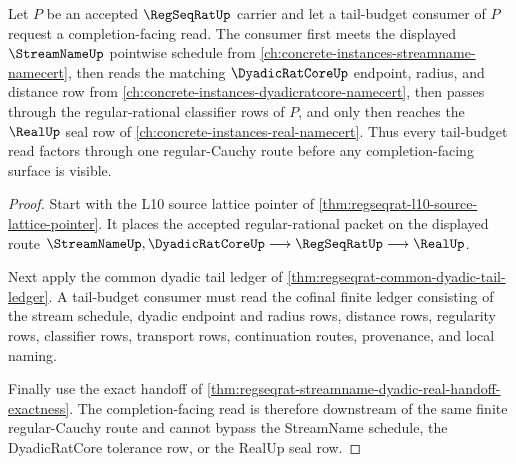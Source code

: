 \begin{theorem}
\label{thm:regseqrat-tail-budget-meet-handoff}
Let $P$ be an accepted $\RegSeqRatUp$ carrier and let a tail-budget consumer of
$P$ request a completion-facing read. The consumer first meets the displayed
$\StreamNameUp$ pointwise schedule from
\autoref{ch:concrete-instances-streamname-namecert}, then reads the matching
$\DyadicRatCoreUp$ endpoint, radius, and distance row from
\autoref{ch:concrete-instances-dyadicratcore-namecert}, then passes through the
regular-rational classifier rows of $P$, and only then reaches the $\RealUp$
seal row of \autoref{ch:concrete-instances-real-namecert}. Thus every
tail-budget read factors through one regular-Cauchy route before any
completion-facing surface is visible.
\end{theorem}
\begin{proof}
Start with the L10 source lattice pointer of
\autoref{thm:regseqrat-l10-source-lattice-pointer}. It places the accepted
regular-rational packet on the displayed route
$\StreamNameUp,\DyadicRatCoreUp \longrightarrow \RegSeqRatUp \longrightarrow
\RealUp$.

Next apply the common dyadic tail ledger of
\autoref{thm:regseqrat-common-dyadic-tail-ledger}. A tail-budget consumer must
read the cofinal finite ledger consisting of the stream schedule, dyadic
endpoint and radius rows, distance rows, regularity rows, classifier rows,
transport rows, continuation routes, provenance, and local naming.

Finally use the exact handoff of
\autoref{thm:regseqrat-streamname-dyadic-real-handoff-exactness}. The
completion-facing read is therefore downstream of the same finite
regular-Cauchy route and cannot bypass the StreamName schedule, the
DyadicRatCore tolerance row, or the RealUp seal row.
\end{proof}

